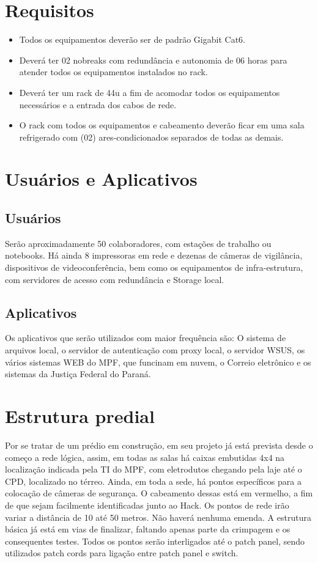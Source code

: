 \documentclass[	DIV=calc,%
							paper=a4,%
							fontsize=12pt,%
							onecolumn]{scrartcl}	 					%
\begin{document}
\section{Requisitos}
\begin{itemize}
\item Todos os equipamentos deverão ser de padrão Gigabit Cat6.
\item Deverá ter 02 nobreaks com redundância e autonomia de 06 horas para atender todos os equipamentos instalados no rack.
\item Deverá ter um rack de 44u a fim de acomodar todos os equipamentos necessários e a entrada dos cabos de rede.
\item O rack com todos os equipamentos e cabeamento deverão ficar em uma sala refrigerado com (02) ares-condicionados separados de todas as demais.	
\end{itemize}

\section{Usuários e Aplicativos}
 
\subsection{Usuários}
Serão aproximadamente 50 colaboradores, com estações de trabalho ou notebooks. Há ainda 8 impressoras em rede e dezenas de câmeras de vigilância, dispositivos de videoconferência, bem como os equipamentos de infra-estrutura, com servidores de acesso com redundância e Storage local.

\subsection{Aplicativos}
Os aplicativos que serão utilizados com maior frequência são: O sistema de arquivos local,  o servidor de autenticação com proxy local, o servidor WSUS, os vários sistemas WEB do MPF, que funcinam em nuvem, o Correio eletrônico e os sistemas da Justiça Federal do Paraná.

\section{Estrutura predial}
Por se tratar de um prédio em construção, em seu projeto já  está prevista desde o começo a rede lógica, assim, em todas as salas há caixas embutidas 4x4 na localização indicada pela TI do MPF, com eletrodutos chegando pela laje até o CPD, localizado no térreo. Ainda, em toda a sede, há pontos específicos para a colocação de câmeras de segurança. O cabeamento dessas está em vermelho, a fim de que sejam facilmente identificadas junto ao Hack. Os pontos de rede irão variar a distância de 10 até 50 metros. Não haverá nenhuma emenda. A estrutura básica já está em vias de finalizar, faltando apenas parte da crimpagem e os consequentes testes. Todos os pontos serão interligados até o patch panel, sendo utilizados patch cords para ligação entre patch panel e switch.
\end{document}
